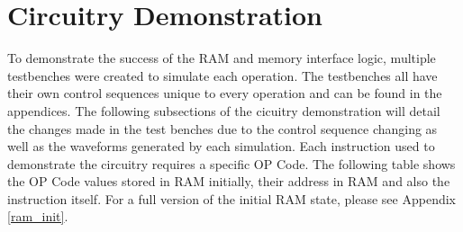 \documentclass{article}
\begin{document}
\section{Circuitry Demonstration}
    To demonstrate the success of the RAM and memory interface logic, multiple testbenches were created to simulate each operation. 
    The testbenches all have their own control sequences unique to every operation and can be found in the appendices. The following subsections 
    of the cicuitry demonstration will detail the changes made in the test benches due to the control sequence changing as well as the waveforms generated by each simulation.
    Each instruction used to demonstrate the circuitry requires a specific OP Code. The following table shows the OP Code values stored in RAM initially, their address in RAM and also the instruction itself. For a full version of the initial RAM state, please see Appendix \ref{ram_init}.
\end{document}

